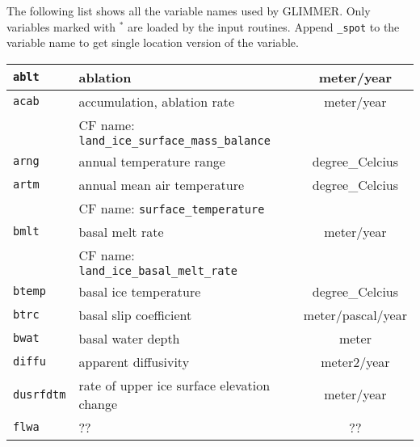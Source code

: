 
\label{ug.sec.varlist}
The following list shows all the variable names used by GLIMMER. Only variables marked with $^\ast$ are loaded by the input routines. Append \texttt{\_spot} to the variable name to get single location version of the variable.
\begin{center}
  \tablelasttail{\hline}
  \begin{supertabular}{|l|p{8cm}|c|}
    \hline
\texttt{ablt} & ablation & meter/year\\
\hline
\texttt{acab} & accumulation, ablation rate & meter/year\\
&CF name: \texttt{land\_ice\_surface\_mass\_balance}&\\
\hline
\texttt{arng} & annual temperature range & degree\_Celcius\\
\hline
\texttt{artm} & annual mean air temperature & degree\_Celcius\\
&CF name: \texttt{surface\_temperature}&\\
\hline
\texttt{bmlt} & basal melt rate & meter/year\\
&CF name: \texttt{land\_ice\_basal\_melt\_rate}&\\
\hline
\texttt{btemp} & basal ice temperature & degree\_Celcius\\
\hline
\texttt{btrc} & basal slip coefficient & meter/pascal/year\\
\hline
\texttt{bwat} & basal water depth & meter\\
\hline
\texttt{diffu} & apparent diffusivity & meter2/year\\
\hline
\texttt{dusrfdtm} & rate of upper ice surface elevation change & meter/year\\
\hline
\texttt{flwa} & ?? & ??\\

\end{supertabular}
\end{center}
